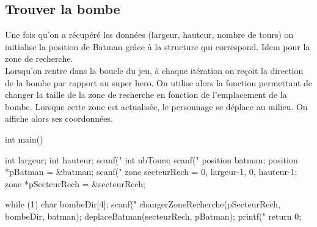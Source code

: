 \documentclass{article}
\begin{document}
\subsection{Trouver la bombe}
Une fois qu'on a récupéré les données (largeur, hauteur, nombre de tours) on initialise la position de Batman grâce à la structure qui correspond. Idem pour la zone de recherche. \\
Lorsqu'on rentre dans la boucle du jeu, à chaque itération on reçoit la direction de la bombe par rapport au super hero. On utilise alors la fonction permettant de changer la taille de la zone de recherche en fonction de l'emplacement de la bombe. Lorsque cette zone est actualisée, le personnage se déplace au milieu. On affiche alors ses coordonnées.
\\

\begin{boxedverbatim}
int main()
{
    int largeur;
    int hauteur;
    scanf("%
    int nbTours;
    scanf("%
    position batman;
    position *pBatman = &batman;
    scanf("%
    zone secteurRech = {0, largeur-1, 0, hauteur-1};
    zone *pSecteurRech = &secteurRech;

    while (1) {
        char bombeDir[4];
        scanf("%
        changerZoneRecherche(pSecteurRech, bombeDir, batman);
        deplaceBatman(secteurRech, pBatman);
        printf("%
    }
    return 0;
}
\end{boxedverbatim}
\end{document}
